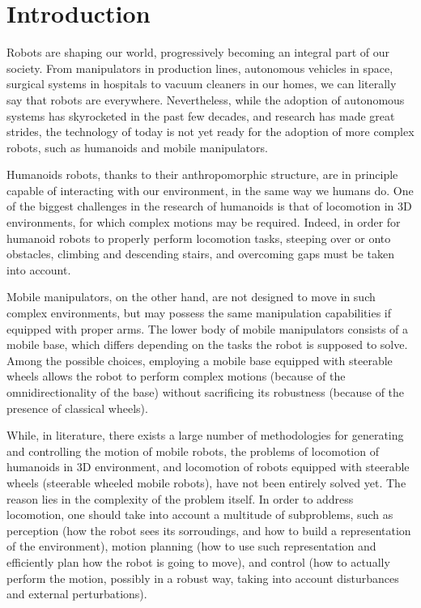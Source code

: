 \chapter{Introduction}
Robots are shaping our world, progressively becoming an integral part of our 
society. From manipulators in production lines, autonomous vehicles in 
space, surgical systems in hospitals to vacuum cleaners in our homes, we can 
literally say that robots are everywhere. Nevertheless, while the adoption of
autonomous systems has skyrocketed in the past few decades, and research has
made great strides, the technology of today
is not yet ready for the adoption of more complex robots, such as humanoids
and mobile manipulators.

Humanoids robots, thanks to their anthropomorphic structure, are in principle 
capable of interacting with our environment, in the same way we humans do.
One of the biggest challenges in the research of humanoids is that of 
locomotion in 3D environments, for which complex motions may be required.
Indeed, in order for humanoid robots to properly perform locomotion tasks, 
steeping over or onto obstacles, climbing and descending stairs, and 
overcoming gaps must be taken into account. 

Mobile manipulators, on the other hand, are not designed to move in such 
complex environments, but may possess the same manipulation capabilities if 
equipped with proper arms. The lower body of mobile manipulators consists
of a mobile base, which differs depending on the tasks the robot is
supposed to solve. Among the possible choices, employing a mobile base equipped 
with steerable wheels allows the robot to perform complex motions (because 
of the omnidirectionality of the base) without sacrificing its robustness
(because of the presence of classical wheels).

While, in literature, there exists a large number of methodologies for
generating and controlling the motion of mobile robots, the problems 
of locomotion of humanoids in 3D environment, and locomotion of robots 
equipped with steerable wheels (steerable wheeled mobile robots), have not been 
entirely solved yet. The reason lies in the complexity of the problem itself.
In order to address locomotion, one should take into account a multitude of 
subproblems, such as perception (how the robot sees its sorroudings,
and how to build a representation of the environment), motion 
planning (how to use such representation and efficiently plan how the robot 
is going to move), and control (how to actually perform the motion, possibly 
in a robust way, taking into account disturbances and external perturbations).


